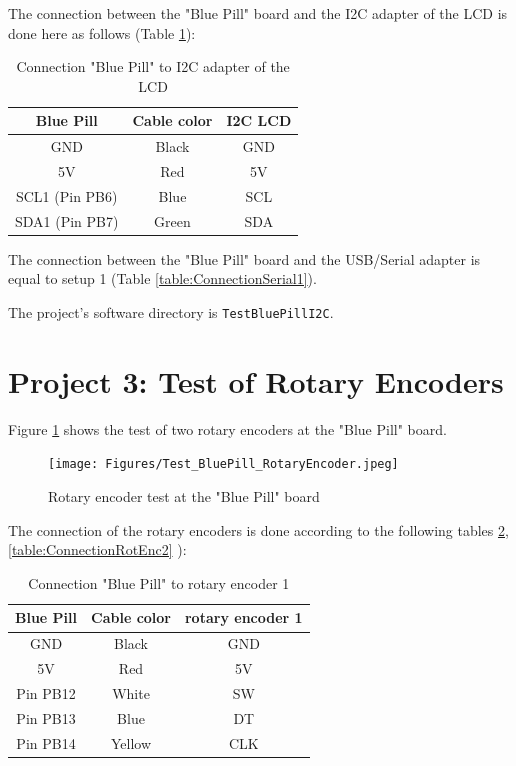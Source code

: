 \documentclass[11pt, oneside]{scrartcl}   	%
\begin{document}
The connection between the "Blue Pill" board and the I2C adapter of the LCD is done here as follows (Table \ref{table:ConnectionI2C}):
\begin{table}[htbp]
	\centering
	\begin{tabular}{|c|c|c|}
		\hline
		\textbf{Blue Pill} & \textbf{Cable color} & \textbf{I2C LCD} \\
		\hline
		GND & Black & GND \\
		\hline
		5V & Red & 5V \\
		\hline
		SCL1 (Pin PB6) & Blue & SCL \\
		\hline
		SDA1 (Pin PB7) & Green & SDA \\
		\hline
	\end{tabular}
\caption{Connection "Blue Pill" to I2C adapter of the LCD}
\label{table:ConnectionI2C}
\end{table}
The connection between the "Blue Pill" board and the USB/Serial adapter is equal to setup 1 (Table \ref{table:ConnectionSerial1}).

The project's software directory is \verb!TestBluePillI2C!.

\newpage
\section{Project 3: Test of Rotary Encoders}
Figure \ref{fig:BluePillRotEnc} shows the test of two rotary encoders  at the "Blue Pill" board.
\begin{figure}[htbp]
	\centering
	\texttt{[image: Figures/Test\_BluePill\_RotaryEncoder.jpeg]}
	\caption{Rotary encoder test at the "Blue Pill" board}
	\label{fig:BluePillRotEnc}
\end{figure}
The connection of the rotary encoders is done according to the following tables
\ref{table:ConnectionRotEnc1}, \ref{table:ConnectionRotEnc2} ):
\begin{table}[htbp]
	\centering
	\begin{tabular}{|c|c|c|}
		\hline
		\textbf{Blue Pill} & \textbf{Cable color} & \textbf{rotary encoder 1} \\
		\hline
		GND & Black & GND \\
		\hline
		5V & Red & 5V \\
		\hline
		Pin PB12 & White & SW \\
		\hline
		Pin PB13 & Blue & DT \\
        \hline
  		Pin PB14 & Yellow & CLK \\
		\hline
	\end{tabular}
\caption{Connection "Blue Pill" to rotary encoder 1}
\label{table:ConnectionRotEnc1}
\end{table}
\end{document}
